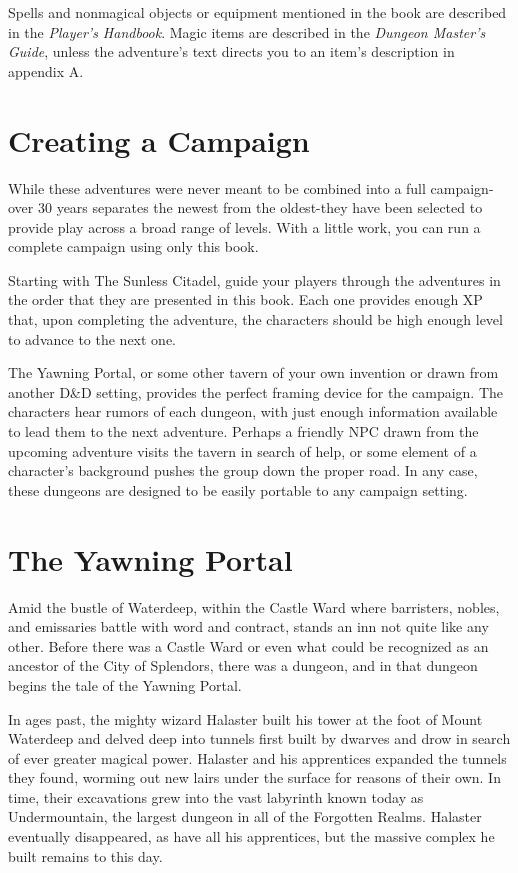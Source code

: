 \documentclass[10pt,a4paper,twoside,bg=print,twocolumn,openany,nodeprecatedcode]{dndbook}
\begin{document}
Spells and nonmagical objects or equipment mentioned in the book are described in the \textit{Player's Handbook}. Magic items are described in the \textit{Dungeon Master's Guide}, unless the adventure's text directs you to an item's description in appendix A.

\section{Creating a Campaign}
While these adventures were never meant to be combined into a full campaign-over 30 years separates the newest from the oldest-they have been selected to provide play across a broad range of levels. With a little work, you can run a complete campaign using only this book.

Starting with The Sunless Citadel, guide your players through the adventures in the order that they are presented in this book. Each one provides enough XP that, upon completing the adventure, the characters should be high enough level to advance to the next one.

The Yawning Portal, or some other tavern of your own invention or drawn from another D\&D setting, provides the perfect framing device for the campaign. The characters hear rumors of each dungeon, with just enough information available to lead them to the next adventure. Perhaps a friendly NPC drawn from the upcoming adventure visits the tavern in search of help, or some element of a character's background pushes the group down the proper road. In any case, these dungeons are designed to be easily portable to any campaign setting.

\section{The Yawning Portal}
Amid the bustle of Waterdeep, within the Castle Ward where barristers, nobles, and emissaries battle with word and contract, stands an inn not quite like any other. Before there was a Castle Ward or even what could be recognized as an ancestor of the City of Splendors, there was a dungeon, and in that dungeon begins the tale of the Yawning Portal.

In ages past, the mighty wizard Halaster built his tower at the foot of Mount Waterdeep and delved deep into tunnels first built by dwarves and drow in search of ever greater magical power. Halaster and his apprentices expanded the tunnels they found, worming out new lairs under the surface for reasons of their own. In time, their excavations grew into the vast labyrinth known today as Undermountain, the largest dungeon in all of the Forgotten Realms. Halaster eventually disappeared, as have all his apprentices, but the massive complex he built remains to this day.
\end{document}
